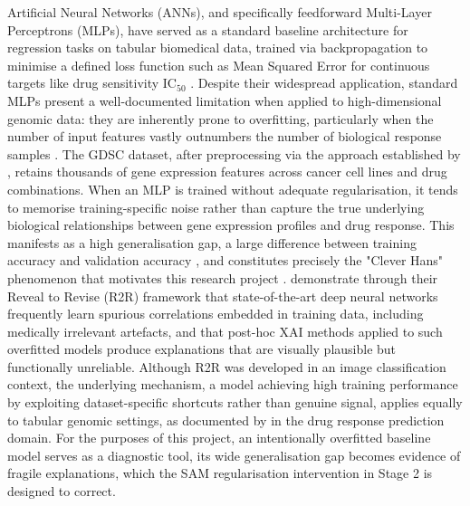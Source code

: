Artificial Neural Networks (ANNs), and specifically feedforward Multi-Layer Perceptrons (MLPs), 
have served as a standard baseline architecture for regression tasks on tabular biomedical data, 
trained via backpropagation to minimise a defined loss function such as Mean Squared Error for 
continuous targets like drug sensitivity IC$_{50}$ \cite{Goodfellow2016,Arrieta2020}.
Despite their widespread application, standard MLPs present a well-documented limitation when 
applied to high-dimensional genomic data: they are inherently prone to overfitting, particularly 
when the number of input features vastly outnumbers the number of biological response samples 
\cite{Partin2023}. The GDSC dataset, after preprocessing via the approach established by 
\cite{Alipour2024}, retains thousands of gene expression features across cancer cell lines and drug 
combinations. When an MLP is trained without adequate regularisation, it tends to memorise 
training-specific noise rather than capture the true underlying biological relationships between 
gene expression profiles and drug response. This manifests as a high generalisation gap, a large 
difference between training accuracy and validation accuracy \cite{Ye2024}, and constitutes 
precisely the "Clever Hans" phenomenon that motivates this research project \cite{Samek2017,Anders2022}. 
\cite{Pahde2023} demonstrate through their Reveal to Revise (R2R) framework that state-of-the-art 
deep neural networks frequently learn spurious correlations embedded in training data, including 
medically irrelevant artefacts, and that post-hoc XAI methods applied to such overfitted models 
produce explanations that are visually plausible but functionally unreliable. Although R2R was 
developed in an image classification context, the underlying mechanism, a model achieving high 
training performance by exploiting dataset-specific shortcuts rather than genuine signal, applies 
equally to tabular genomic settings, as documented by \cite{Partin2023}in the drug response 
prediction domain. For the purposes of this project, an intentionally overfitted baseline model 
serves as a diagnostic tool,  its wide generalisation gap becomes evidence of fragile explanations, 
which the SAM regularisation intervention in Stage 2 is designed to correct.

